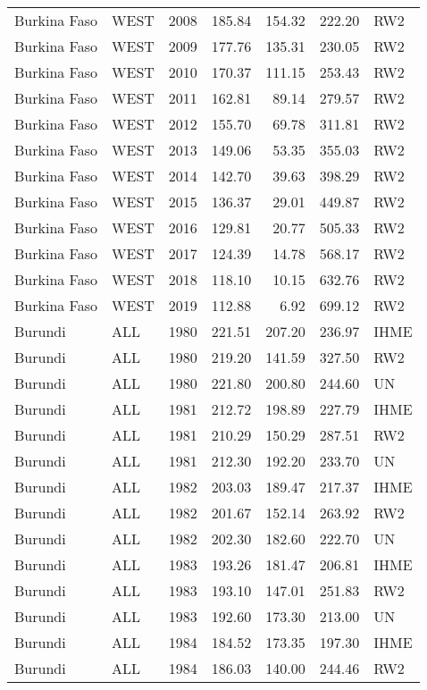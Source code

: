\begin{longtable}{lllrrrl}
  Burkina Faso & WEST & 2008 & 185.84 & 154.32 & 222.20 & RW2 \\ 
  Burkina Faso & WEST & 2009 & 177.76 & 135.31 & 230.05 & RW2 \\ 
  Burkina Faso & WEST & 2010 & 170.37 & 111.15 & 253.43 & RW2 \\ 
  Burkina Faso & WEST & 2011 & 162.81 & 89.14 & 279.57 & RW2 \\ 
  Burkina Faso & WEST & 2012 & 155.70 & 69.78 & 311.81 & RW2 \\ 
  Burkina Faso & WEST & 2013 & 149.06 & 53.35 & 355.03 & RW2 \\ 
  Burkina Faso & WEST & 2014 & 142.70 & 39.63 & 398.29 & RW2 \\ 
  Burkina Faso & WEST & 2015 & 136.37 & 29.01 & 449.87 & RW2 \\ 
  Burkina Faso & WEST & 2016 & 129.81 & 20.77 & 505.33 & RW2 \\ 
  Burkina Faso & WEST & 2017 & 124.39 & 14.78 & 568.17 & RW2 \\ 
  Burkina Faso & WEST & 2018 & 118.10 & 10.15 & 632.76 & RW2 \\ 
  Burkina Faso & WEST & 2019 & 112.88 & 6.92 & 699.12 & RW2 \\ 
  Burundi & ALL & 1980 & 221.51 & 207.20 & 236.97 & IHME \\ 
  Burundi & ALL & 1980 & 219.20 & 141.59 & 327.50 & RW2 \\ 
  Burundi & ALL & 1980 & 221.80 & 200.80 & 244.60 & UN \\ 
  Burundi & ALL & 1981 & 212.72 & 198.89 & 227.79 & IHME \\ 
  Burundi & ALL & 1981 & 210.29 & 150.29 & 287.51 & RW2 \\ 
  Burundi & ALL & 1981 & 212.30 & 192.20 & 233.70 & UN \\ 
  Burundi & ALL & 1982 & 203.03 & 189.47 & 217.37 & IHME \\ 
  Burundi & ALL & 1982 & 201.67 & 152.14 & 263.92 & RW2 \\ 
  Burundi & ALL & 1982 & 202.30 & 182.60 & 222.70 & UN \\ 
  Burundi & ALL & 1983 & 193.26 & 181.47 & 206.81 & IHME \\ 
  Burundi & ALL & 1983 & 193.10 & 147.01 & 251.83 & RW2 \\ 
  Burundi & ALL & 1983 & 192.60 & 173.30 & 213.00 & UN \\ 
  Burundi & ALL & 1984 & 184.52 & 173.35 & 197.30 & IHME \\ 
  Burundi & ALL & 1984 & 186.03 & 140.00 & 244.46 & RW2 \\ 

\end{longtable}
